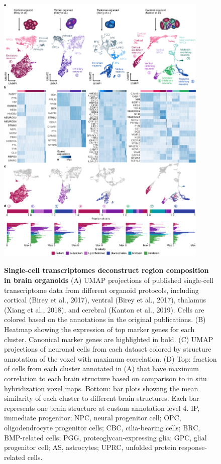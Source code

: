 \begin{figure}[H]
    \centering
	\includegraphics[width=0.9\textwidth]{figures/voxhunt/Figure_3}
    \label{fig:vox3}

    \caption{\textbf{Single-cell transcriptomes deconstruct region composition in brain organoids} (A) UMAP projections of published single-cell transcriptome data from different organoid protocols, including cortical (Birey et al., 2017), ventral (Birey et al., 2017), thalamus (Xiang et al., 2018), and cerebral (Kanton et al., 2019). Cells are colored based on the annotations in the original publications. (B) Heatmap showing the expression of top marker genes for each cluster. Canonical marker genes are highlighted in bold. (C) UMAP projections of neuronal cells from each dataset colored by structure annotation of the voxel with maximum correlation. (D) Top: fraction of cells from each cluster annotated in (A) that have maximum correlation to each brain structure based on comparison to in situ hybridization voxel maps. Bottom: bar plots showing the mean similarity of each cluster to different brain structures. Each bar represents one brain structure at custom annotation level 4.
    IP, immediate progenitor; NPC, neural progenitor cell; OPC, oligodendrocyte progenitor cells; CBC, cilia-bearing cells; BRC, BMP-related cells; PGG, proteoglycan-expressing glia; GPC, glial progenitor cell; AS, astrocytes; UPRC, unfolded protein response-related cells.}
\end{figure}



